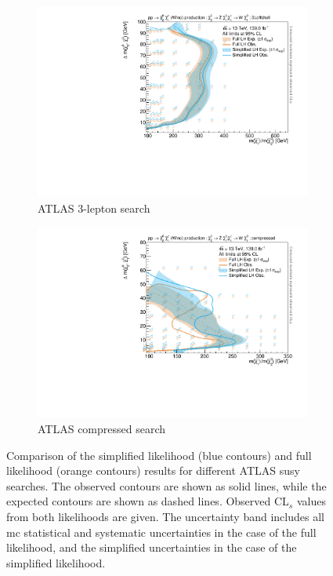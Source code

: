 \begin{figure}
\begin{subfigure}[b]{0.5\textwidth}
		\centering\includegraphics[width=\textwidth]{exclusion_3Loffshell_CLs_noLabel}
		\caption{ATLAS 3-lepton search\label{fig:results_3Loffshell}}
	\end{subfigure}\hfill
	\begin{subfigure}[b]{0.5\textwidth}
		\centering\includegraphics[width=\textwidth]{exclusion_compressed_CLs_noLabel}
		\caption{ATLAS compressed search~\cite{SUSY-2018-16}\label{fig:results_compressed}}
	\end{subfigure}\hfill
	\caption{Comparison of the simplified likelihood (blue contours) and full likelihood (orange contours) results for different ATLAS \gls{susy} searches. The observed contours are shown as solid lines, while the expected contours are shown as dashed lines. Observed CL$_s$ values from both likelihoods are given. The uncertainty band includes all \gls{mc} statistical and systematic uncertainties in the case of the full likelihood, and the simplified uncertainties in the case of the simplified likelihood.}\label{fig:results_analyses}
\end{figure}



